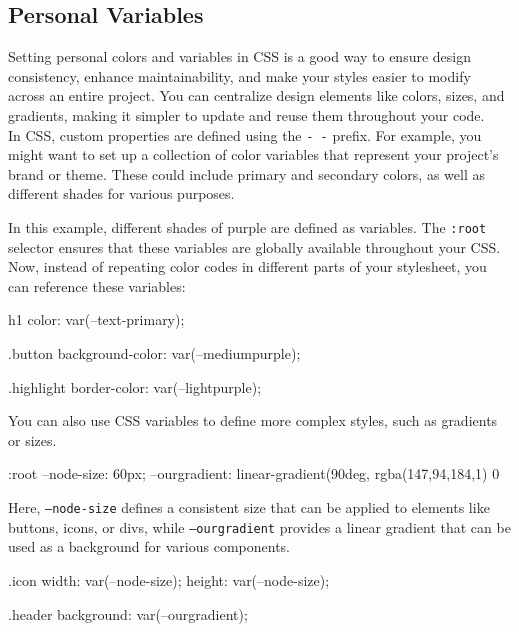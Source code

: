 \subsection*{Personal Variables}
Setting personal colors and variables in CSS is a good way to ensure design consistency, enhance maintainability, and make your styles easier to modify across an entire project.
You can centralize design elements like colors, sizes, and gradients, making it simpler to update and reuse them throughout your code.
\\ \newline
In CSS, custom properties are defined using the \texttt{- -} prefix.
For example, you might want to set up a collection of color variables that represent your project's brand or theme.
These could include primary and secondary colors, as well as different shades for various purposes.
In this example, different shades of purple are defined as variables.
The \texttt{:root} selector ensures that these variables are globally available throughout your CSS. Now, instead of repeating color codes in different parts of your stylesheet, you can reference these variables:
\begin{myxmlbox}
    h1 {
        color: var(--text-primary);
    }

    .button {
        background-color: var(--mediumpurple);
    }

    .highlight {
        border-color: var(--lightpurple);
    }
\end{myxmlbox}
You can also use CSS variables to define more complex styles, such as gradients or sizes.
\begin{myxmlbox}
    :root {
        --node-size: 60px;
        --ourgradient: linear-gradient(90deg, rgba(147,94,184,1) 0%
    }
\end{myxmlbox}
Here, \texttt{--node-size} defines a consistent size that can be applied to elements like buttons, icons, or divs, while \texttt{--ourgradient} provides a linear gradient that can be used as a background for various components.


\begin{myxmlbox}
    .icon {
        width: var(--node-size);
        height: var(--node-size);
    }

    .header {
        background: var(--ourgradient);
    }
\end{myxmlbox}


